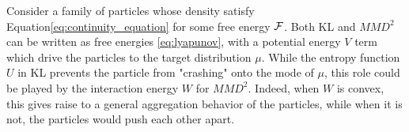 \begin{remark}
	Consider a family of particles whose density satisfy Equation\cref{eq:continuity_equation} for some free energy ${{\mathcal F}}$. Both KL and $MMD^2$ can be written as free energies \eqref{eq:lyapunov}, with a potential energy $V$ term which drive the particles to the target distribution $\mu$. While the entropy function $U$ in KL prevents the particle from "crashing" onto the mode of $\mu$, this role could be played by the interaction energy $W$ for $MMD^2$. Indeed, when $W$ is convex, this gives raise to a general aggregation behavior of the particles, while when it is not, the particles would push each other apart.
\end{remark}

 










